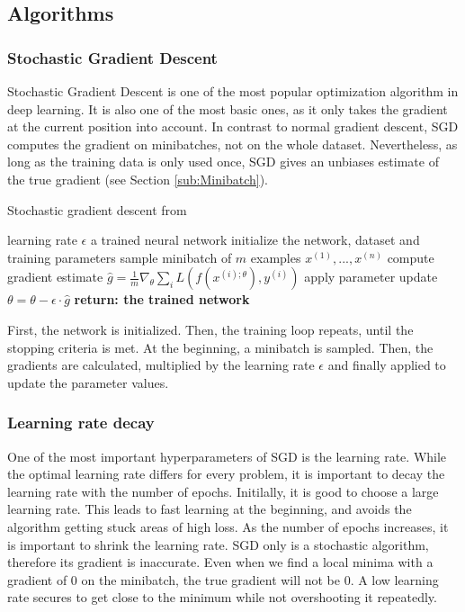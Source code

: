 \subsection{Algorithms}
\subsubsection{Stochastic Gradient Descent}\label{SGD}
Stochastic Gradient Descent is one of the most popular optimization algorithm in
deep learning. It is also one of the most basic ones, as it only takes the
gradient at the current position into account. In contrast to normal gradient
descent, SGD computes the gradient on minibatches, not on the whole dataset.
Nevertheless, as long as the training data is only used once, SGD gives an
unbiases estimate of the true gradient (see Section \ref{sub:Minibatch}). 

\begin{algorithm}\label{alg:SGD}
    \begin{algorithmic}[1]
        \caption{Stochastic gradient descent from \cite{Goodfellow-et-al-2016}}
        \REQUIRE learning rate $\epsilon$
        \ENSURE a trained neural network
        \STATE initialize the network, dataset and training parameters
            \STATE sample minibatch of $m$ examples ${x^{(1)}, ... ,x^{(n)}}$
            \STATE compute gradient estimate $\hat{g}=\frac{1}{m} \nabla_\theta \sum_i L(f(x^{(i);\theta}),y^{(i)})$
            \STATE apply parameter update $\theta=\theta-\epsilon\cdot\hat{g}$
        \ENDWHILE
        \STATE \textbf{return: the trained network}
    \end{algorithmic}
\end{algorithm}

First, the network is initialized. Then, the training loop repeats, until the
stopping criteria is met. At the beginning, a minibatch is sampled. Then, the
gradients are calculated, multiplied by the learning rate $\epsilon$ and finally
applied to update the parameter values.


\subsubsection{Learning rate decay}\label{sub:Learing_rate_decay}
One of the most important hyperparameters of SGD is the learning rate. While the
optimal learning rate differs for every problem, it is important to decay the
learning rate with the number of epochs. Initilally, it is good to choose a
large learning rate. This leads to fast learning at the beginning, and avoids
the algorithm getting stuck areas of high loss. As the number of epochs
increases, it is important to shrink the learning rate. SGD only is a stochastic
algorithm, therefore its gradient is inaccurate. Even when we find a local
minima with a gradient of 0 on the minibatch, the true gradient will not be 0. A
low learning rate secures to get close to the minimum while not overshooting it
repeatedly.

